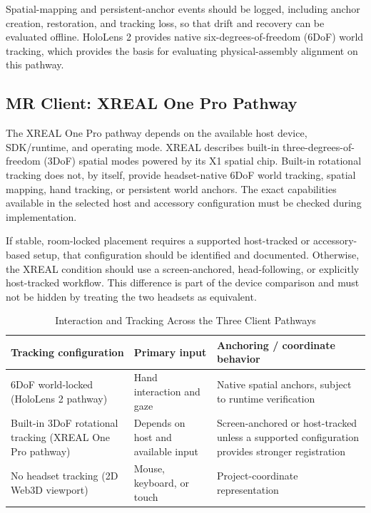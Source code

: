 \documentclass[conference]{IEEEtran}
\begin{document}
Spatial-mapping and persistent-anchor events should be logged, including anchor creation, restoration, and tracking loss, so that drift and recovery can be evaluated offline. HoloLens 2 provides native six-degrees-of-freedom (6DoF) world tracking, which provides the basis for evaluating physical-assembly alignment on this pathway.

\subsection{MR Client: XREAL One Pro Pathway}
The XREAL One Pro pathway depends on the available host device, SDK/runtime, and operating mode. XREAL describes built-in three-degrees-of-freedom (3DoF) spatial modes powered by its X1 spatial chip. Built-in rotational tracking does not, by itself, provide headset-native 6DoF world tracking, spatial mapping, hand tracking, or persistent world anchors. The exact capabilities available in the selected host and accessory configuration must be checked during implementation.

If stable, room-locked placement requires a supported host-tracked or accessory-based setup, that configuration should be identified and documented. Otherwise, the XREAL condition should use a screen-anchored, head-following, or explicitly host-tracked workflow. This difference is part of the device comparison and must not be hidden by treating the two headsets as equivalent.

\begin{table}[t]
\caption{Interaction and Tracking Across the Three Client Pathways}
\label{tab:tracking}
\centering
\small
\begin{tabularx}{\textwidth}{p{}p{}Y}
\toprule
\textbf{Tracking configuration} & \textbf{Primary input} & \textbf{Anchoring / coordinate behavior}\\
\midrule
6DoF world-locked (HoloLens 2 pathway) & Hand interaction and gaze & Native spatial anchors, subject to runtime verification\\
Built-in 3DoF rotational tracking (XREAL One Pro pathway) & Depends on host and available input & Screen-anchored or host-tracked unless a supported configuration provides stronger registration\\
No headset tracking (2D Web3D viewport) & Mouse, keyboard, or touch & Project-coordinate representation\\
\bottomrule
\end{tabularx}
\end{table}
\end{document}
